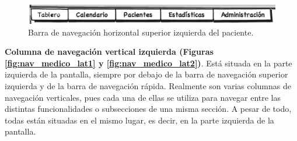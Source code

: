 			
			\begin{figure}[H]
			  \centering
			    \includegraphics[width=15cm]{img/jpg/nav/medico_sup1.jpg}
			  \caption{Barra de navegación horizontal superior izquierda del paciente.}
			  \label{fig:nav_medico_sup1}
			\end{figure}
			
			\bigskip
			\bigskip
			\bigskip
			\textbf{Columna de navegación vertical izquierda (Figuras \ref{fig:nav_medico_lat1} y \ref{fig:nav_medico_lat2})}. Está situada en la parte izquierda de la pantalla, siempre por debajo de la barra de navegación superior izquierda y de la barra de navegación rápida. Realmente son varias columnas de navegación verticales, pues cada una de ellas se utiliza para navegar entre las distintas funcionalidades o subsecciones de una misma sección. A pesar de todo, todas están situadas en el mismo lugar, es decir, en la parte izquierda de la pantalla.
			
			
